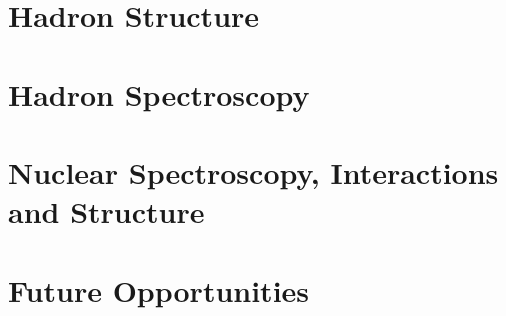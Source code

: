 \documentclass[hyperpdf,aps,prd,superscriptaddress,nofootinbib,preprint,preprintnumbers,floatfix,tightenlines]{revtex4-1}
\begin{document}
\section{Hadron Structure}
\label{sec:hadronstructure}


\section{Hadron Spectroscopy}
\label{sec:hadronspectroscopy}


\section{Nuclear Spectroscopy, Interactions and Structure}
\label{sec:nuclear}


\section{Future Opportunities}
\label{sec:future}


\begin{figure}
    \vspace*{3cm}
\end{figure}



\end{document}
